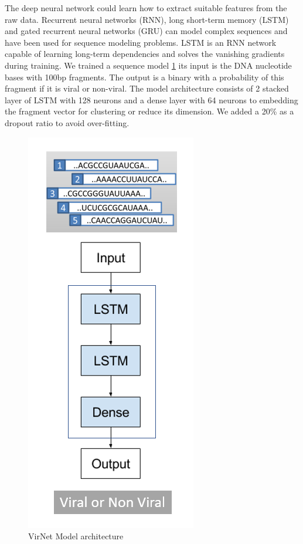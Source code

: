 \documentclass[conference]{IEEEtran}
\begin{document}
The deep neural network could learn how to extract suitable features from the raw data. Recurrent neural networks (RNN), long short-term memory (LSTM) \cite{hochreiter1997long} and gated recurrent neural networks (GRU) \cite{chung2014empirical} can model complex sequences and have been used for sequence modeling problems. LSTM is an RNN network capable of learning long-term dependencies and solves the vanishing gradients during training. We trained a sequence model \ref{fig:model_diagram} its input is the DNA nucleotide bases with 100bp fragments. The output is a binary with a probability of this fragment if it is viral or non-viral. The model architecture consists of 2 stacked layer of LSTM with 128 neurons and a dense layer with 64 neurons to embedding the fragment vector for clustering or reduce its dimension. We added a 20\% as a dropout ratio to avoid over-fitting. 


\begin{figure}
	\centering
	\includegraphics[width=0.5\columnwidth]{imgs/model_diagram.PNG}
	\caption{VirNet Model architecture}
	\label{fig:model_diagram}
\end{figure}
\end{document}
